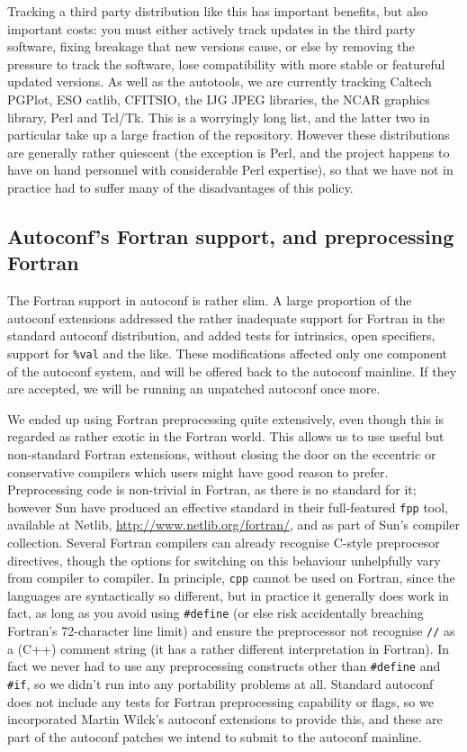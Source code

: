 \documentclass{speauth}
\begin{document}
Tracking \label{s:tracking} a third party distribution like this has
important benefits, but also important costs: you must either actively
track updates in the third party software, fixing breakage that new
versions cause, or else by removing the pressure to track the
software, lose compatibility with more stable or featureful updated
versions.  As well as the autotools, we are currently tracking Caltech
PGPlot, ESO catlib, CFITSIO, the IJG JPEG libraries, the NCAR graphics
library, Perl and Tcl/Tk.  This is a worryingly long list, and the
latter two in particular take up a large fraction of the repository.
However these distributions are generally rather quiescent (the
exception is Perl, and the project happens to have on hand personnel
with considerable Perl expertise), so that we have not in practice had
to suffer many of the disadvantages of this policy.

\subsection{Autoconf's Fortran support, and preprocessing Fortran}

The Fortran support in autoconf is rather slim.  A large proportion of the
autoconf extensions addressed the rather inadequate support for
Fortran in the standard autoconf distribution, and added tests for
intrinsics, open specifiers, support for \texttt{\%val} 
and the like.  These modifications affected only one component of the
autoconf system, and will be offered back to the autoconf mainline.
If they are accepted, we will be running an unpatched autoconf once
more.

We ended up using Fortran preprocessing quite extensively, even though
this is regarded as rather exotic in the Fortran world.  This allows
us to use useful but non-standard Fortran extensions, without closing
the door on the eccentric or conservative compilers which users might
have good reason to prefer.  Preprocessing code is non-trivial in
Fortran, as there is no standard for it; however Sun have produced an
effective standard in their full-featured \texttt{fpp} tool, available
at Netlib, \url{http://www.netlib.org/fortran/}, and as part of Sun's
compiler collection.  Several Fortran compilers can already recognise
C-style preprocesor directives, though the options for switching on
this behaviour unhelpfully vary from compiler to compiler.  In
principle, \texttt{cpp} cannot be used on Fortran, since the languages
are syntactically so different, but in practice it generally does work
in fact, as long as you avoid using \texttt{\#define} (or else risk
accidentally breaching Fortran's 72-character line limit) and ensure
the preprocessor not recognise \texttt{//} as a (C++) comment string
(it has a rather different interpretation in Fortran).  In fact we
never had to use any preprocessing constructs other than
\texttt{\#define} and \texttt{\#if}, so we didn't run into any
portability problems at all.  Standard autoconf does not include any
tests for Fortran preprocessing capability or flags, so we
incorporated Martin Wilck's autoconf extensions to provide this, and
these are part of the autoconf patches we intend to submit to the
autoconf mainline.
\end{document}
